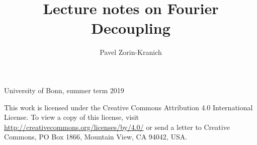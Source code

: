 \documentclass[11pt,oneside]{article}
\begin{document}
\setcounter{section}{-1}

\title{Lecture notes on Fourier Decoupling}
\author{Pavel Zorin-Kranich}
\maketitle
\begin{center}
University of Bonn, summer term 2019
\end{center}

This work is licensed under the Creative Commons Attribution 4.0 International License.
To view a copy of this license, visit \url{http://creativecommons.org/licenses/by/4.0/} or send a letter to Creative Commons, PO Box 1866, Mountain View, CA 94042, USA.

\tableofcontents











\appendix




\printbibliography[heading=bibintoc]
\end{document}
